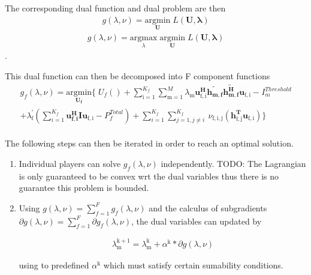 \documentclass[12pt]{article}
\begin{document}
The corresponding dual function and dual problem are then 
\begin{gather*}
g(\lambda,\nu) = \underset{\mathbf{U}}{\mathrm{argmin}}\;L(\mathbf{U,\lambda})
\end{gather*}
\begin{gather*}
g(\lambda,\nu) = \underset{\lambda}{\mathrm{argmax}}\;\underset{\mathbf{U}}{\mathrm{argmin}}\;L(\mathbf{U,\lambda})
\end{gather*}
.



This dual function can then be decomposed into F component functions
\begin{multline}
g_f(\lambda,\nu) = \underset{\mathbf{U_f}}{\mathrm{argmin}}
\{
\;
U_f() 
+
\sum_{\mathrm{i=1}}^{K_f}
\sum_{\mathrm{m=1}}^M \lambda_{\mathrm{m}}
\mathbf{u_{ \mathrm{f,i}}^H} \mathbf{\tilde{h_{m,f}}} \mathbf{\tilde{h_{m,f}^H}} \mathbf{u_{\mathrm{f,i}}} - I^{Threshold}_{m}
\\
+ 
\lambda_{\mathrm{f}}^{'}(
\sum_{i=1}^{K_f}\mathbf{u_{f,i}^H} \mathbf{I} \mathbf{u_{\mathrm{f,i}}} -  P^{Total}_{f})
+
\sum_{i=1}^{K_f}
\sum_{j=1, j\neq i}^{K_f}
\
\nu_{\mathrm{f,i,j}}(\mathbf{h^T_{\mathrm{f,j}}}\mathbf{u_{\mathrm{f,i}}})\}
\end{multline}
\\



The following steps can then be iterated in order to reach an optimal solution. 
\begin{enumerate}
\item 
Individual players can solve $ g_f(\lambda,\nu) $ independently.
TODO: The Lagrangian is only guaranteed to be convex wrt the dual variables thus there is no guarantee this problem is bounded. 
\item 
Using $g(\lambda,\nu) = \sum_{f=1}^{F}g_f(\lambda,\nu)$ and the calculus of subgradients $\partial g(\lambda,\nu) = \sum_{f=1}^{F} \partial g_f(\lambda,\nu)$, the dual variables can updated by 

\begin{gather}
\lambda_{\mathrm{m}}^{\mathrm{k+1}} = 
\lambda_{\mathrm{m}}^{\mathrm{k}}
+
\alpha^{\mathrm{k}}*
\partial g(\lambda,\nu)
\end{gather}

using to predefined $\alpha^{\mathrm{k}}$ which must satisfy certain sumability conditions.



\end{enumerate} 
\end{document}
